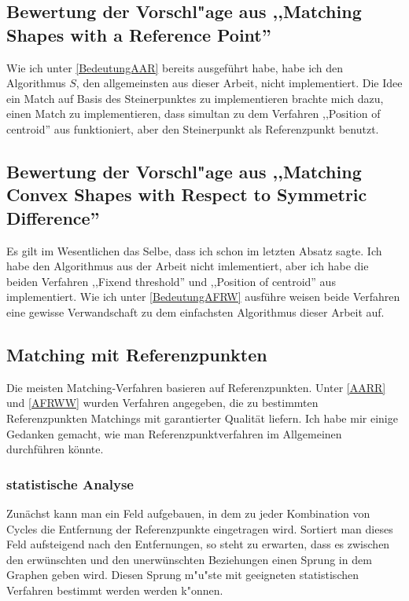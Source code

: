 \subsection[Bewertung der Vorschl"age aus \cite{AAR}]{Bewertung der Vorschl"age aus ,,Matching Shapes with a Reference Point'' \cite{AAR}}

Wie ich unter \ref{BedeutungAAR} bereits ausgeführt habe, habe ich den Algorithmus $S$, den allgemeinsten aus dieser Arbeit, nicht implementiert. Die Idee ein Match auf Basis des Steinerpunktes zu implementieren brachte mich dazu, einen Match zu implementieren, dass simultan zu dem Verfahren ,,Position of centroid'' aus \cite{TG} funktioniert, aber den Steinerpunkt als Referenzpunkt benutzt.

\subsection[Bewertung der Vorschl"age aus\cite{AFRW}]{Bewertung der Vorschl"age aus ,,Matching Convex Shapes with Respect to Symmetric Difference'' \cite{AFRW}}

Es gilt im Wesentlichen das Selbe, dass ich schon im letzten Absatz sagte. Ich habe den Algorithmus aus der Arbeit nicht imlementiert, aber ich habe die beiden Verfahren ,,Fixend threshold'' und ,,Position of centroid'' aus \cite{TG} implementiert. Wie ich unter \ref{BedeutungAFRW} ausführe weisen beide Verfahren  eine gewisse Verwandschaft zu dem einfachsten Algorithmus dieser Arbeit auf. 


\subsection{Matching mit Referenzpunkten}

Die meisten Matching-Verfahren basieren auf Referenzpunkten. Unter \ref{AARR} und \ref{AFRWW} wurden Verfahren angegeben, die zu bestimmten Referenzpunkten Matchings mit garantierter Qualität liefern. Ich habe mir einige Gedanken gemacht, wie man Referenzpunktverfahren im Allgemeinen durchführen könnte.

\subsubsection*{statistische Analyse}

Zunächst kann man ein Feld aufgebauen, in dem zu jeder Kombination von Cycles die Entfernung der Referenzpunkte eingetragen wird. Sortiert man dieses Feld aufsteigend nach den Entfernungen, so steht zu erwarten, dass es zwischen den erwünschten und den unerwünschten Beziehungen einen Sprung in dem Graphen geben wird.  Diesen Sprung m"u"ste mit geeigneten statistischen Verfahren bestimmt werden werden k"onnen. 

